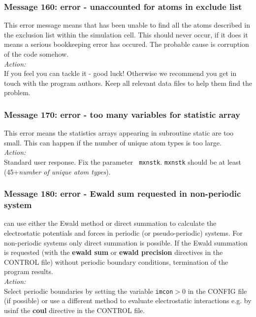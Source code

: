\subsubsection*{Message 160: error - unaccounted for atoms in exclude list }

This error message means that \D{} has been unable to find all the
atoms described in the exclusion list within the simulation cell. This
should never occur, if it does it means a serious bookkeeping error has
occured. The probable cause is corruption of the code somehow. \\ 

\noindent
{\em Action:} \\ 
If you feel you can tackle it - good luck!  Otherwise we recommend you
get in touch with the program authors. Keep all relevant data files to
help them find the problem.

\subsubsection*{Message 170: error - too many variables for statistic array }

This error means the statistics arrays appearing in subroutine {\sc
static} are too small. This can happen if the number of unique atom
types is too large. \\ 

\noindent
{\em Action:} \\ Standard user response. Fix the parameter {\tt
mxnstk}.  {\tt mxnstk} should be at least (45+{\em number of unique
atom types}).

\subsubsection*{Message 180: error - Ewald sum requested in
non-periodic system}

\D{} can use either the Ewald method or direct summation to
calculate the electrostatic potentials and forces in periodic (or
pseudo-periodic) systems.  For non-periodic systems only direct
summation is possible. If the Ewald summation  is requested (with the
{\bf ewald sum} or {\bf ewald precision} directives in the CONTROL file) without periodic boundary
conditions, termination of the program results. \\

\noindent
{\em Action:} \\ 
Select periodic boundaries by setting the variable {\tt imcon}$>$0 in
the CONFIG file (if possible) or use a different method to evaluate electrostatic interactions
e.g. by usinf the {\bf coul} directive in the CONTROL file.

